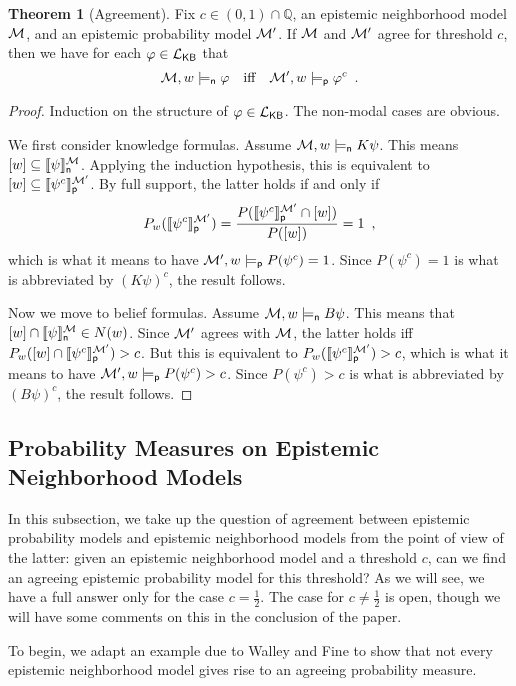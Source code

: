\documentclass[12pt]{article}
\theoremstyle{definition}
\newtheorem{theorem}{Theorem}[section]
\newcommand{\Rat}{\mathbb{Q}}  %
\newcommand{\M}{{\cal M}}      %
\newcommand{\Lang}{{\cal L}}   %
\newcommand{\KB}{{\mathsf{KB}}}                 %
\newcommand{\modelsn}{\models_{\mathsf{n}}}                  %
\newcommand{\semn}[1]{\llbracket{#1}\rrbracket_{\mathsf{n}}} %
\newcommand{\modelsp}{\models_{\mathsf{p}}}                  %
\newcommand{\semp}[1]{\llbracket{#1}\rrbracket_{\mathsf{p}}} %
\begin{document}
\begin{theorem}[Agreement]
  \label{theorem:agreement}\label{BettingTheorem}
  Fix $c\in(0,1)\cap\Rat$, an epistemic neighborhood model $\M$, and
  an epistemic probability model $\M'$. If $\M$ and $\M'$ agree for
  threshold $c$, then we have for each $\varphi \in \Lang_\KB$ that
  \[
  \M,w\modelsn\varphi \quad\text{iff}\quad
  \M',w\modelsp\varphi^c\enspace.
  \]
\end{theorem}
\begin{proof}
  Induction on the structure of $\varphi\in\Lang_\KB$. The non-modal
  cases are obvious.

  We first consider knowledge formulas. Assume $\M,w \modelsn
  K\psi$.  This means $[w]\subseteq\semn{\psi}^{\M}$. Applying the
  induction hypothesis, this is equivalent to
  $[w]\subseteq\semp{\psi^c}^{\M'}$.  By full support, the latter
  holds if and only if
  \[
  P_w(\semp{\psi^c}^{\M'}) =
  \frac{P(\semp{\psi^c}^{\M'}\cap[w])}{P([w])}=1 \enspace,
  \]
  which is what it means to have $\M',w\modelsp P(\psi^c)=1$.  Since
  $P(\psi^c)=1$ is what is abbreviated by $(K\psi)^c$, the result
  follows.

  Now we move to belief formulas. Assume $\M,w \modelsn B\psi$.
  This means that $[w]\cap\semn{\psi}^{\M}\in N(w)$.  Since $\M'$
  agrees with $\M$, the latter holds iff
  $P_w([w]\cap\semp{\psi^c}^{\M'})>c$.  But this is equivalent
  to $P_w(\semp{\psi^c}^{\M'})>c$, which is what it means to have
  $\M',w \modelsp P(\psi^c)>c$.  Since $P(\psi^c)>c$ is what is
  abbreviated by $(B\psi)^c$, the result follows.
\end{proof}


\subsection{Probability Measures on Epistemic Neighborhood Models}

In this subsection, we take up the question of agreement between
epistemic probability models and epistemic neighborhood models from
the point of view of the latter: given an epistemic neighborhood model
and a threshold $c$, can we find an agreeing epistemic probability
model for this threshold? As we will see, we have a full answer only
for the case $c=\frac 12$.  The case for $c\neq\frac 12$ is open,
though we will have some comments on this in the conclusion of the
paper.

To begin, we adapt an example due to Walley and Fine
\cite{WalleyFine1979:vomacp} to show that not every epistemic
neighborhood model gives rise to an agreeing probability measure.
\end{document}
